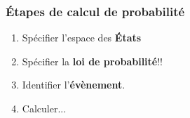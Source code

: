 \documentclass{beamer}
\begin{document}
\begin{frame}[t]
    \frametitle{Étapes de calcul de probabilité}
\begin{enumerate}
    \small
    \item Spécifier l'espace des \textbf{États}\\[.5cm]
    \item Spécifier la \textbf{loi de probabilité}!!\\[.5cm]
    \item Identifier l'\textbf{évènement}.\\[1cm]
    \item Calculer...

\end{enumerate}
    
\end{frame}
\end{document}
